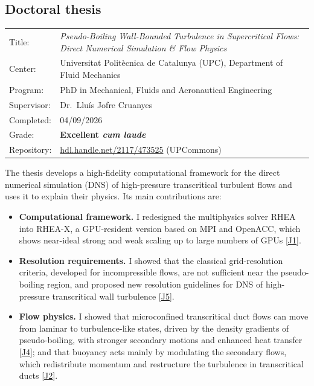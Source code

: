 \documentclass[11pt]{article}
\begin{document}
\subsection{Doctoral thesis}\label{sec:thesis}
\begin{tabular}{@{}p{2.6cm}p{13.3cm}@{}}
Title:       & \emph{Pseudo-Boiling Wall-Bounded Turbulence in Supercritical Flows: Direct
               Numerical Simulation \& Flow Physics} \\
Center:      & Universitat Polit\`ecnica de Catalunya (UPC), Department of Fluid Mechanics \\
Program:     & PhD in Mechanical, Fluids and Aeronautical Engineering \\
Supervisor:  & Dr.\ Llu\'is Jofre Cruanyes \\
Completed:   & 04/09/2026 \\
Grade:       & \textbf{Excellent \emph{cum laude}} \\
Repository:  & \href{https://hdl.handle.net/2117/473525}{hdl.handle.net/2117/473525} (UPCommons) \\
\end{tabular}

\medskip
The thesis develops a high-fidelity computational framework for the direct numerical
simulation (DNS) of high-pressure transcritical turbulent flows and uses it to explain
their physics. Its main contributions are:
\begin{itemize}
  \item \textbf{Computational framework.} I redesigned the multiphysics solver RHEA into
  RHEA-X, a GPU-resident version based on MPI and OpenACC, which shows near-ideal strong
  and weak scaling up to large numbers of GPUs [\hyperlink{pub-J1}{J1}].
  \item \textbf{Resolution requirements.} I showed that the classical grid-resolution
  criteria, developed for incompressible flows, are not sufficient near the pseudo-boiling
  region, and proposed new resolution guidelines for DNS of high-pressure transcritical
  wall turbulence [\hyperlink{pub-J5}{J5}].
  \item \textbf{Flow physics.} I showed that microconfined transcritical duct flows can
  move from laminar to turbulence-like states, driven by the density gradients of
  pseudo-boiling, with stronger secondary motions and enhanced heat transfer [\hyperlink{pub-J4}{J4}]; and
  that buoyancy acts mainly by modulating the secondary flows, which redistribute momentum
  and restructure the turbulence in transcritical ducts [\hyperlink{pub-J2}{J2}].
\end{itemize}
\end{document}
